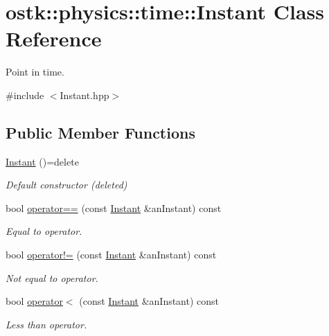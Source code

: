\hypertarget{classostk_1_1physics_1_1time_1_1_instant}{}\section{ostk\+:\+:physics\+:\+:time\+:\+:Instant Class Reference}
\label{classostk_1_1physics_1_1time_1_1_instant}


Point in time.  




{\ttfamily \#include $<$Instant.\+hpp$>$}

\subsection*{Public Member Functions}
\begin{DoxyCompactItemize}
\item 
\hyperlink{classostk_1_1physics_1_1time_1_1_instant_a132c1e4b2fe9a9a671109206e297bd5d}{Instant} ()=delete
\begin{DoxyCompactList}\small\item\em Default constructor (deleted) \end{DoxyCompactList}\item 
bool \hyperlink{classostk_1_1physics_1_1time_1_1_instant_a701dd98cce0e8b7536aab09555a889f2}{operator==} (const \hyperlink{classostk_1_1physics_1_1time_1_1_instant}{Instant} \&an\+Instant) const
\begin{DoxyCompactList}\small\item\em Equal to operator. \end{DoxyCompactList}\item 
bool \hyperlink{classostk_1_1physics_1_1time_1_1_instant_a897d758d25118001f6958c865cb6f0e2}{operator!=} (const \hyperlink{classostk_1_1physics_1_1time_1_1_instant}{Instant} \&an\+Instant) const
\begin{DoxyCompactList}\small\item\em Not equal to operator. \end{DoxyCompactList}\item 
bool \hyperlink{classostk_1_1physics_1_1time_1_1_instant_a17692f0ecb5ab2feecf153c0e1d9d2a4}{operator$<$} (const \hyperlink{classostk_1_1physics_1_1time_1_1_instant}{Instant} \&an\+Instant) const
\begin{DoxyCompactList}\small\item\em Less than operator. \end{DoxyCompactList}\item 

\end{DoxyCompactItemize}
